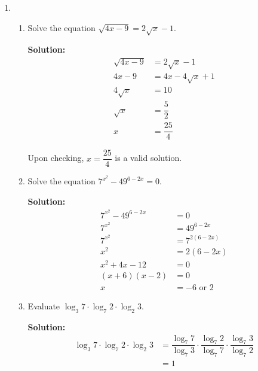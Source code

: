 \documentclass{report}
\newcommand{\sol}{\vspace{0.2cm}\textbf{Solution:}\vspace{0.2cm}}
\begin{document}
\begin{multicols*}{2}
\begin{enumerate}[leftmargin=*]
        \item \begin{enumerate}
                  \item Solve the equation $\sqrt{4 x-9}=2 \sqrt{x}-1$.

                        \sol{}
                        \begin{align*}
                            \sqrt{4x-9} & = 2\sqrt{x} - 1      \\
                            4x - 9      & = 4x - 4\sqrt{x} + 1 \\
                            4\sqrt{x}   & = 10                 \\
                            \sqrt{x}    & = \dfrac{5}{2}       \\
                            x           & = \dfrac{25}{4}
                        \end{align*}

                        Upon checking, $x=\dfrac{25}{4}$ is a valid solution.

                  \item Solve the equation $7^{x^2}-49^{6-2 x}=0$.

                        \sol{}
                        \begin{align*}
                            7^{x^2} - 49^{6-2x} & = 0                \\
                            7^{x^2}             & = 49^{6-2x}        \\
                            7^{x^2}             & = 7^{2(6-2x)}      \\
                            x^2                 & = 2(6-2x)          \\
                            x^2 + 4x - 12       & = 0                \\
                            (x+6)(x-2)          & = 0                \\
                            x                   & = -6 \text{ or } 2
                        \end{align*}

                  \item Evaluate $\log _3 7 \cdot \log _7 2 \cdot \log _2 3$.

                        \sol{}
                        \begin{align*}
                            \log_3 7 \cdot \log_7 2 \cdot \log_2 3 & = \dfrac{\log_7 7}{\log_7 3} \cdot \dfrac{\log_7 2}{\log_7 7} \cdot \dfrac{\log_7 3}{\log_7 2} \\
                                                                   & = 1
                        \end{align*}
              \end{enumerate}


\end{enumerate}
\end{multicols*}
\end{document}
